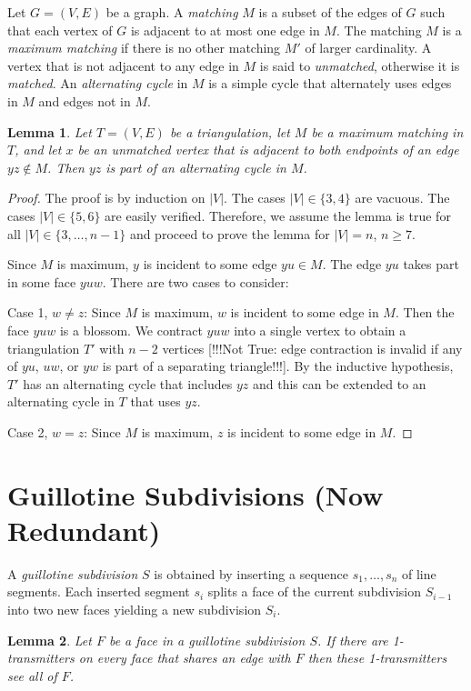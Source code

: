 \documentclass{article}
\newtheorem{lem}{Lemma}
\begin{document}
Let $G=(V,E)$ be a graph.  A \emph{matching} $M$ is a subset of the
edges of $G$ such that each vertex of $G$ is adjacent to at most one
edge in $M$.  The matching $M$ is a \emph{maximum matching} if there
is no other matching $M'$ of larger cardinality.  A vertex that is not
adjacent to any edge in $M$ is said to \emph{unmatched}, otherwise it
is \emph{matched}.  An \emph{alternating cycle} in $M$ is a simple cycle
that alternately uses edges in $M$ and edges not in $M$.

\begin{lem}
Let $T=(V,E)$ be a triangulation, let $M$ be a maximum matching in $T$,
and let $x$ be an unmatched vertex that is adjacent to both endpoints of
an edge $yz\not\in M$.  Then $yz$ is part of an alternating cycle in $M$.
\end{lem}

\begin{proof}
The proof is by induction on $|V|$.  The cases $|V|\in\{3,4\}$ are vacuous.  The cases $|V|\in\{5,6\}$ are easily verified.  Therefore, we assume the lemma is true for all $|V|\in\{3,\ldots,n-1\}$ and proceed to prove the lemma for $|V|=n$, $n\ge 7$.

Since $M$ is maximum, $y$ is incident to some edge $yu\in M$.  The edge $yu$ takes part in some face $yuw$.  There are two cases to consider:

\noindent
Case 1, $w\neq z$: Since $M$ is maximum, $w$ is incident to some edge
in $M$.  Then the face $yuw$ is a blossom.  We contract $yuw$ into
a single vertex to obtain a triangulation $T'$ with $n-2$ vertices
[!!!Not True: edge contraction is invalid if any of $yu$, $uw$, or $yw$
is part of a separating triangle!!!].  By the inductive hypothesis, $T'$
has an alternating cycle that includes $yz$ and this can be extended to
an alternating cycle in $T$ that uses $yz$.

Case 2, $w= z$:  Since $M$ is maximum, $z$ is incident to some edge in $M$.
\end{proof}


\section*{Guillotine Subdivisions (Now Redundant)}
A \emph{guillotine subdivision} $S$ is obtained by inserting a sequence 
$s_1,\ldots,s_n$ of line segments.  Each inserted segment $s_i$ splits a face of
the current subdivision $S_{i-1}$ into two new faces yielding a new subdivision $S_i$.

\begin{lem}\label{lem:chop}
Let $F$ be a face in a guillotine subdivision $S$.  If there are
1-transmitters on every face that shares an edge with $F$ then these
1-transmitters see all of $F$.
\end{lem}
\end{document}
